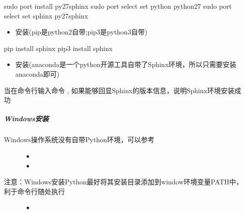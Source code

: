 \documentclass[a4paper,10pt,english]{sphinxmanual}
\begin{document}
\begin{sphinxVerbatim}[commandchars=\\\{\}]
\PYGZdl{} sudo port install py27\PYGZhy{}sphinx
\PYGZdl{} sudo port select \PYGZhy{}\PYGZhy{}set python python27
\PYGZdl{} sudo port select \PYGZhy{}\PYGZhy{}set sphinx py27\PYGZhy{}sphinx
\end{sphinxVerbatim}
\begin{itemize}
\item {} 
 安装(pip是python2自带;pip3是python3自带)

\end{itemize}

\begin{sphinxVerbatim}[commandchars=\\\{\}]
\PYGZdl{} pip install sphinx
\PYGZdl{} pip3 install sphinx
\end{sphinxVerbatim}
\begin{itemize}
\item {} 
 安装(anaconda是一个python开源工具自带了Sphinx环境，所以只需要安装anaconda即可)

\end{itemize}

当在命令行输入命令  , 如果能够回显Sphinx的版本信息，说明Sphinx环境安装成功

\begin{figure}[htbp]
\centering

\noindent{}
\end{figure}


\subparagraph{Windows安装}
\label{\detokenize{sphinx/1-generate/2-install:windows}}\begin{description}
\item[{Windows操作系统没有自带Python环境，可以参考}] \leavevmode\begin{itemize}
\item {} 

\item {} 

\end{itemize}

\item[{注意：Windows安装Python最好将其安装目录添加到window环境变量PATH中，利于命令行随处执行}] \leavevmode\begin{itemize}
\item {} 

\end{itemize}

\end{description}
\end{document}
